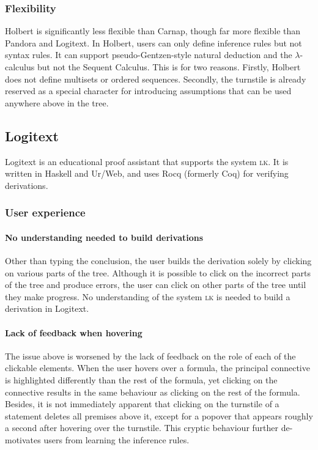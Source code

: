 \subsubsection{Flexibility}
Holbert is significantly less flexible than Carnap, though far more flexible than Pandora and Logitext. In Holbert, users can only define inference rules but not syntax rules. It can support pseudo-Gentzen-style natural deduction and the $\lambda$-calculus but not the Sequent Calculus. This is for two reasons. Firstly, Holbert does not define multisets or ordered sequences. Secondly, the turnstile is already reserved as a special character for introducing assumptions that can be used anywhere above in the tree.

\subsection{Logitext}
Logitext \cite{yang:2022} is an educational proof assistant that supports the system \textsc{lk}. It is written in Haskell and Ur/Web, and uses Rocq (formerly Coq) for verifying derivations.
\subsubsection{User experience}
\paragraph{No understanding needed to build derivations}
Other than typing the conclusion, the user builds the derivation solely by clicking on various parts of the tree. Although it is possible to click on the incorrect parts of the tree and produce errors, the user can click on other parts of the tree until they make progress. No understanding of the system \textsc{lk} is needed to build a derivation in Logitext.

\paragraph{Lack of feedback when hovering}
The issue above is worsened by the lack of feedback on the role of each of the clickable elements. When the user hovers over a formula, the principal connective is highlighted differently than the rest of the formula, yet clicking on the connective results in the same behaviour as clicking on the rest of the formula. Besides, it is not immediately apparent that clicking on the turnstile of a statement deletes all premises above it, except for a popover that appears roughly a second after hovering over the turnstile. This cryptic behaviour further de-motivates users from learning the inference rules.

